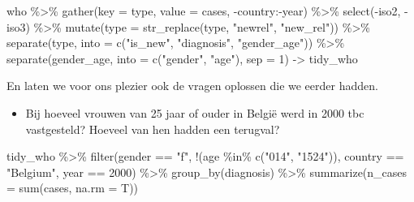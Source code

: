 \documentclass[]{tufte-book}
\newenvironment{Shaded}{}{}
\newcommand{\AttributeTok}[1]{\textcolor[rgb]{0.49,0.56,0.16}{#1}}
\newcommand{\DecValTok}[1]{\textcolor[rgb]{0.25,0.63,0.44}{#1}}
\newcommand{\FunctionTok}[1]{\textcolor[rgb]{0.02,0.16,0.49}{#1}}
\newcommand{\NormalTok}[1]{#1}
\newcommand{\OtherTok}[1]{\textcolor[rgb]{0.00,0.44,0.13}{#1}}
\newcommand{\SpecialCharTok}[1]{\textcolor[rgb]{0.25,0.44,0.63}{#1}}
\newcommand{\StringTok}[1]{\textcolor[rgb]{0.25,0.44,0.63}{#1}}
\providecommand{\tightlist}{%
  \setlength{\itemsep}{0pt}\setlength{\parskip}{0pt}}
\begin{document}
\begin{Shaded}
\begin{Highlighting}[]
\NormalTok{who }\SpecialCharTok{\%\textgreater{}\%}
  \FunctionTok{gather}\NormalTok{(}\AttributeTok{key =}\NormalTok{ type, }\AttributeTok{value =}\NormalTok{ cases, }\SpecialCharTok{{-}}\NormalTok{country}\SpecialCharTok{:{-}}\NormalTok{year) }\SpecialCharTok{\%\textgreater{}\%}
  \FunctionTok{select}\NormalTok{(}\SpecialCharTok{{-}}\NormalTok{iso2, }\SpecialCharTok{{-}}\NormalTok{iso3) }\SpecialCharTok{\%\textgreater{}\%}
  \FunctionTok{mutate}\NormalTok{(}\AttributeTok{type =} \FunctionTok{str\_replace}\NormalTok{(type, }\StringTok{"newrel"}\NormalTok{, }\StringTok{"new\_rel"}\NormalTok{)) }\SpecialCharTok{\%\textgreater{}\%}
  \FunctionTok{separate}\NormalTok{(type, }\AttributeTok{into =} \FunctionTok{c}\NormalTok{(}\StringTok{"is\_new"}\NormalTok{, }\StringTok{"diagnosis"}\NormalTok{, }\StringTok{"gender\_age"}\NormalTok{)) }\SpecialCharTok{\%\textgreater{}\%}
  \FunctionTok{separate}\NormalTok{(gender\_age, }\AttributeTok{into =} \FunctionTok{c}\NormalTok{(}\StringTok{"gender"}\NormalTok{, }\StringTok{"age"}\NormalTok{), }\AttributeTok{sep =} \DecValTok{1}\NormalTok{) }\OtherTok{{-}\textgreater{}}\NormalTok{ tidy\_who}
\end{Highlighting}
\end{Shaded}

En laten we voor ons plezier ook de vragen oplossen die we eerder hadden.

\begin{itemize}
\tightlist
\item
  Bij hoeveel vrouwen van 25 jaar of ouder in België werd in 2000 tbc vastgesteld? Hoeveel van hen hadden een terugval?
\end{itemize}

\begin{Shaded}
\begin{Highlighting}[]
\NormalTok{tidy\_who }\SpecialCharTok{\%\textgreater{}\%}
  \FunctionTok{filter}\NormalTok{(gender }\SpecialCharTok{==} \StringTok{"f"}\NormalTok{, }\SpecialCharTok{!}\NormalTok{(age }\SpecialCharTok{\%in\%} \FunctionTok{c}\NormalTok{(}\StringTok{"014"}\NormalTok{, }\StringTok{"1524"}\NormalTok{)), country }\SpecialCharTok{==} \StringTok{"Belgium"}\NormalTok{, year }\SpecialCharTok{==} \DecValTok{2000}\NormalTok{) }\SpecialCharTok{\%\textgreater{}\%}
  \FunctionTok{group\_by}\NormalTok{(diagnosis) }\SpecialCharTok{\%\textgreater{}\%}
  \FunctionTok{summarize}\NormalTok{(}\AttributeTok{n\_cases =} \FunctionTok{sum}\NormalTok{(cases, }\AttributeTok{na.rm =}\NormalTok{ T))}
\end{Highlighting}
\end{Shaded}
\end{document}
